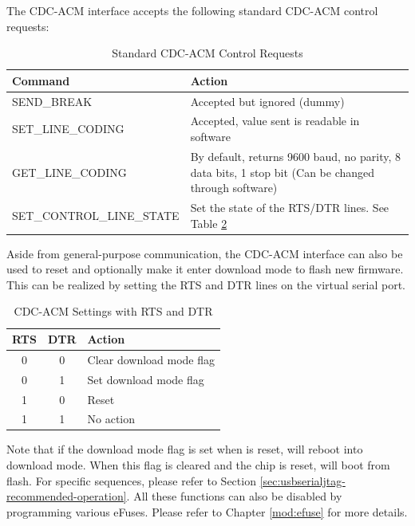\documentclass[main\_\_EN.tex]{subfiles}
\begin{document}
The CDC-ACM interface accepts the following standard CDC-ACM control requests:

\begin{table}[H]
\centering
\caption{Standard CDC-ACM Control Requests}
\label{tab:usbserialjtag-standard-cdc-acm-requests}

\begin{tabular}{ | l | p{10cm} | }\hline
\rowcolor{lightgray}
\textbf{Command} & \textbf{Action} \\\hline

SEND\_BREAK & Accepted but ignored (dummy) \\\hline
SET\_LINE\_CODING & Accepted, value sent is readable in software \\\hline
GET\_LINE\_CODING & By default, returns 9600 baud, no parity, 8 data bits, 1 stop bit (Can be changed through software) \\\hline
SET\_CONTROL\_LINE\_STATE & Set the state of the RTS/DTR lines. See Table \ref{tab:usbserialjtag-cdc-acm-settings-with-rts-and-dtr} \\\hline
\end{tabular}
\end{table}

Aside from general-purpose communication, the CDC-ACM interface can also be used to reset \chipname{} and optionally make it enter download mode to flash new firmware. This can be realized by setting the RTS and DTR lines on the virtual serial port.

\begin{table}[H]
\centering
\caption{CDC-ACM Settings with RTS and DTR}
\label{tab:usbserialjtag-cdc-acm-settings-with-rts-and-dtr}

\begin{tabular}{ | c | c | p{5cm} | }\hline
\rowcolor{lightgray}
\textbf{RTS} & \textbf{DTR} & \textbf{Action}\\\hline

0 & 0 & Clear download mode flag  \\\hline
0 & 1 & Set download mode flag  \\\hline
1 & 0 & Reset \chipname{}  \\\hline
1 & 1 & No action \\\hline
\end{tabular}
\end{table}

Note that if the download mode flag is set when \chipname{} is reset, \chipname{} will reboot into download mode. When this flag is cleared and the chip is reset, \chipname{} will boot from flash. For specific sequences, please refer to Section \ref{sec:usbserialjtag-recommended-operation}. All these functions can also be disabled by programming various eFuses. Please refer to Chapter \ref{mod:efuse} \textit{} for more details.
\end{document}
